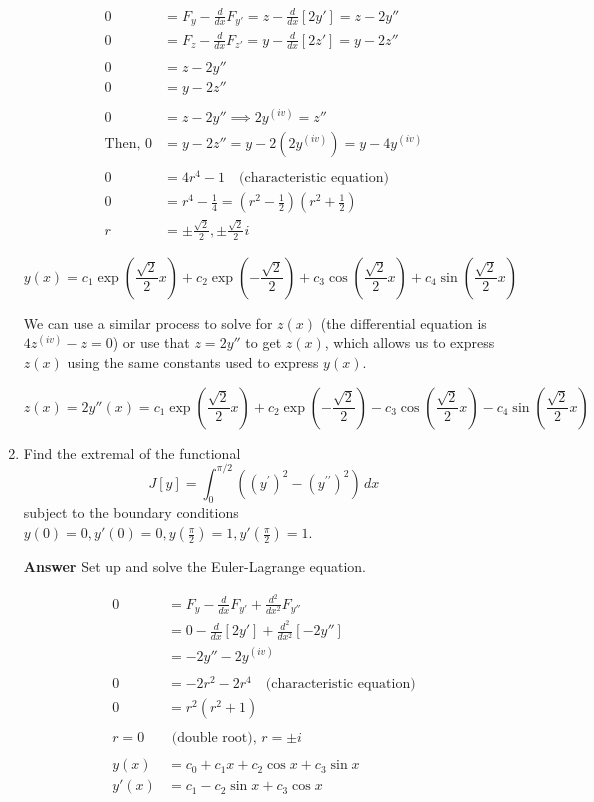 \documentclass[12pt]{article}
\begin{document}
\begin{enumerate}
\begin{align*}
0 &= F_y - \frac{d}{dx}F_{y'} = z - \frac{d}{dx}[2y'] = z - 2y'' \\
0 &= F_z - \frac{d}{dx}F_{z'} = y - \frac{d}{dx}[2z'] = y - 2z''\\
& \\
0 &= z-2y''\\
0 &= y - 2z''\\
& \\
0 &= z - 2y'' \implies 2y^{(iv)} = z''\\
\text{Then, } 0 &= y - 2z'' = y - 2(2y^{(iv)}) = y - 4y^{(iv)}\\
& \\
0 &= 4r^4 - 1 \quad \text{(characteristic equation)}\\
0 &= r^4 - \frac{1}{4} = (r^2 - \frac{1}{2})(r^2 + \frac{1}{2})\\
r &= \pm \frac{\sqrt{2}}{2}, \pm \frac{\sqrt{2}}{2} i
\end{align*}

$$\boxed{y(x) = c_1\exp\left(\frac{\sqrt{2}}{2} x \right)+ c_2 \exp \left(-\frac{\sqrt{2}}{2}\right) + c_3 \cos \left(\frac{\sqrt{2}}{2} x \right) + c_4 \sin \left(\frac{\sqrt{2}}{2}x \right)} $$


We can use a similar process to solve for $z(x)$ (the differential equation is $4z^{(iv)} - z = 0$) or use that $z = 2y''$ to get $z(x)$, which allows us to express $z(x)$ using the same constants used to express $y(x)$.


$$\boxed{z(x) = 2y''(x) =  c_1\exp\left(\frac{\sqrt{2}}{2} x \right)+ c_2 \exp \left(-\frac{\sqrt{2}}{2}\right) - c_3 \cos \left(\frac{\sqrt{2}}{2} x \right) - c_4 \sin \left(\frac{\sqrt{2}}{2}x \right)}$$


\newpage
\item Find the extremal of the functional
$$
J[y] = \int_0^{\pi/2} \left((y^{\prime})^2 - (y^{\prime\prime})^2 \right) \,dx
$$
subject to the boundary conditions $y(0) = 0, y'(0) = 0, y\left(\frac{\pi}{2}\right) = 1, y'\left(\frac{\pi}{2}\right) = 1$.

{\bf Answer} Set up and solve the Euler-Lagrange equation.

\begin{align*}
0 &= F_y - \frac{d}{dx}F_{y'} + \frac{d^2}{dx^2}F_{y''} \\
&= 0 -\frac{d}{dx}[2y'] + \frac{d^2}{dx^2}[-2y'']\\
&= -2y'' - 2y^{(iv)} \\
& \\
0 &= -2r^2 - 2r^4 \quad \text{(characteristic equation)} \\
0 &= r^2(r^2+1) \\
&\\
r = 0 & \text{ (double root), } r = \pm i \\
&\\
y(x) &= c_0 + c_1x + c_2\cos x + c_3 \sin x \\
y'(x) &= c_1 - c_2 \sin x + c_3 \cos x
\end{align*}


\end{enumerate}
\end{document}
